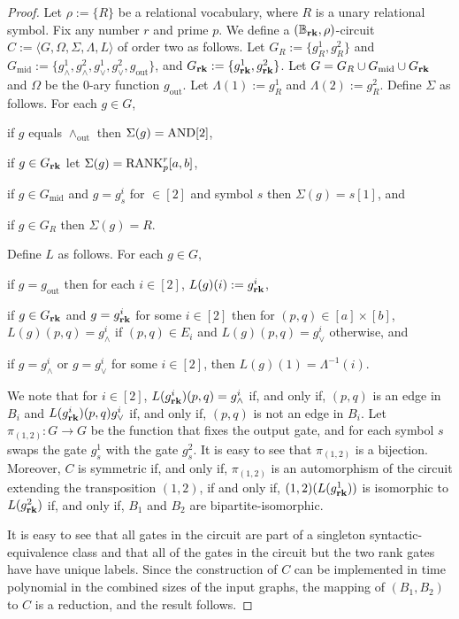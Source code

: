 \documentclass[../paper.tex]{subfiles}
\begin{document}
\begin{proof}
  Let $\rho:= \{R\}$ be a relational vocabulary, where $R$ is a unary relational
  symbol. Fix any number $r$ and prime $p$. We define a $(\mathbb{B}_{\text{\textbf{rk}}}, \rho)$-circuit $C
  := \langle G, \Omega, \Sigma, \Lambda, L \rangle$ of order two as follows. Let
  $G_{R} := \{g^1_{R}, g^2_{R}\}$ and $G_{\text{mid}} := \{g^1_{\land},
  g^2_\land, g^1_\lor, g^2_\lor , g_{\text{out}}\}$, and $G_{\text{\textbf{rk}}} : = \{
  g^1_{\text{\textbf{rk}}}, g^2_{\text{\textbf{rk}}}\}$. Let $G = G_R \cup G_{\text{mid}} \cup G_{\text{\textbf{rk}}}$
  and $\Omega$ be the $0$-ary function $g_{\text{out}}$. Let $\Lambda(1) :=
  g^1_{R}$ and $\Lambda(2) := g^2_{R}$. Define $\Sigma$ as follows. For each $g
  \in G$,
  \begin{myitemize}
  \item if $g$ equals $\land_{\text{out}}$ then $\Sigma(g) = \text{\upshape AND}[2]$,
  \item if $g \in G_{\text{\textbf{rk}}}$ let $\Sigma(g) = \text{\upshape RANK}^r_p [a,b]$,
  \item if $g \in G_{\text{mid}}$ and $g = g^i_s$ for $ \in [2]$ and symbol $s$
    then $\Sigma(g) = s[1]$, and
  \item if $g \in G_R$ then $\Sigma(g) = R$.
  \end{myitemize}
  Define $L$ as follows. For each $g \in G$,
  \begin{myitemize}
  \item if $g = g_{\text{out}}$ then for each $i \in [2]$, $L(g)(i) :=
    g^i_{\text{\textbf{rk}}}$,
  \item if $g \in G_{\text{\textbf{rk}}}$ and $g = g^i_{\text{\textbf{rk}}}$ for some $i \in [2]$ then for
    $(p,q) \in [a]\times [b]$, $L(g)(p,q) = g^i_\land$ if $(p,q) \in E_i$ and
    $L(g)(p,q) = g^i_\lor$ otherwise, and
  \item if $g = g^i_\land$ or $g = g^i_{\lor}$ for some $i \in [2]$, then
    $L(g)(1) = \Lambda^{-1}(i)$.
  \end{myitemize}

  We note that for $i \in [2]$, $L(g^i_{\text{\textbf{rk}}})(p,q)= g^i_\land$ if, and only
  if, $(p,q)$ is an edge in $B_i$ and $L(g^i_{\text{\textbf{rk}}})(p,q) g^i_\lor$ if, and
  only if, $(p,q)$ is not an edge in $B_i$. Let $\pi_{(1,2)} : G \rightarrow G$
  be the function that fixes the output gate, and for each symbol $s$ swaps the
  gate $g^1_s$ with the gate $g^2_s$. It is easy to see that $\pi_{(1,2)}$ is a
  bijection. Moreover, $C$ is symmetric if, and only if, $\pi_{(1,2)}$ is an
  automorphism of the circuit extending the transposition $(1,2)$, if and only
  if, $(1,2) (L(g^1_{\text{\textbf{rk}}}))$ is isomorphic to $L(g^2_{\text{\textbf{rk}}})$ if, and only
  if, $B_1$ and $B_2$ are bipartite-isomorphic.
 
  It is easy to see that all gates in the circuit are part of a singleton
  syntactic-equivalence class and that all of the gates in the circuit but the
  two rank gates have have unique labels. Since the construction of $C$ can be
  implemented in time polynomial in the combined sizes of the input graphs, the
  mapping of $(B_1, B_2)$ to $C$ is a reduction, and the result follows.
\end{proof}
\end{document}
